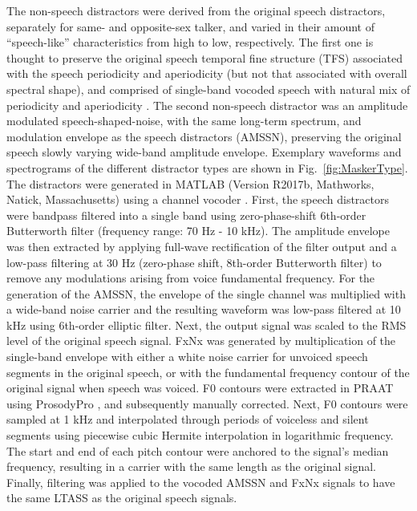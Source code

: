 \documentclass[a4paper, twoside]{templates/ociamthesis}
\begin{document}
The non-speech distractors were derived from the original speech distractors, separately for same- and opposite-sex talker, and varied in their amount of ``speech-like'' characteristics from high to low, respectively. The first one is thought to preserve the original speech temporal fine structure (TFS) associated with the speech periodicity and aperiodicity (but not that associated with overall spectral shape), and comprised of single-band vocoded speech with natural mix of periodicity and aperiodicity \autocite[FxNx; also described in][]{Steinmetzger2015}. The second non-speech distractor was an amplitude modulated speech-shaped-noise, with the same long-term spectrum, and modulation envelope as the speech distractors (AMSSN), preserving the original speech slowly varying wide-band amplitude envelope. Exemplary waveforms and spectrograms of the different distractor types are shown in Fig.~\ref{fig:MaskerType}. The distractors were generated in MATLAB (Version R2017b, Mathworks, Natick, Massachusetts) using a channel vocoder \autocites[described in][]{Green2013,Steinmetzger2015}. First, the speech distractors were bandpass filtered into a single band using zero-phase-shift 6th-order Butterworth filter (frequency range: 70 Hz - 10 kHz). The amplitude envelope was then extracted by applying full-wave rectification of the filter output and a low-pass filtering at 30 Hz (zero-phase shift, 8th-order Butterworth filter) to remove any modulations arising from voice fundamental frequency. For the generation of the AMSSN, the envelope of the single channel was multiplied with a wide-band noise carrier and the resulting waveform was low-pass filtered at 10 kHz using 6th-order elliptic filter. Next, the output signal was scaled to the RMS level of the original speech signal. FxNx was generated by multiplication of the single-band envelope with either a white noise carrier for unvoiced speech segments in the original speech, or with the fundamental frequency contour of the original signal when speech was voiced. F0 contours were extracted in PRAAT \autocite[Version 6.0.19;][]{Boersma2001} using ProsodyPro \autocite[Version 5.7.2;][]{Xu2013}, and subsequently manually corrected. Next, F0 contours were sampled at 1 kHz and interpolated through periods of voiceless and silent segments using piecewise cubic Hermite interpolation in logarithmic frequency. The start and end of each pitch contour were anchored to the signal's median frequency, resulting in a carrier with the same length as the original signal. Finally, filtering was applied to the vocoded AMSSN and FxNx signals to have the same LTASS as the original speech signals.\\
\end{document}
